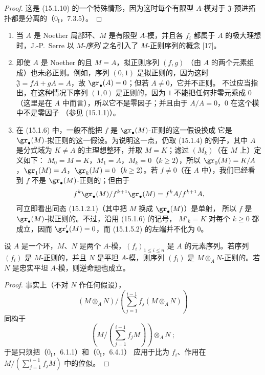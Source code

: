 \begin{proof}
这是 (15.1.10) 的一个特殊情形，因为这时每个有限型 $A$-模对于
$\mathfrak{J}$-预进拓扑都是分离的（$0_{\mathrm I}$，7.3.5）。
\end{proof}

\begin{remarks}[15.1.12]
\label{0.15.1.12-fr}
\mbox{}
\begin{enumerate}
  \item[(i)] 当 $A$ 是 Noether 局部环、$M$ 是有限型 $A$-模，并且各
  $f_i$ 都属于 $A$ 的极大理想时，J.-P.~Serre 以 $M$-\emph{序列}
  之名引入了 $M$-正则序列的概念 [17]。
  \item[(ii)] 即使 $A$ 是 Noether 的且 $M=A$，拟正则序列 $(f,g)$
  （由 $A$ 的两个元素组成）也未必正则。例如，序列 $(0,1)$ 是拟正则的，因为这时
  $\mathfrak{J}=fA+gA=A$，故 $\gr_\bullet(A)=0$；但若 $A\neq0$，它并不正则。
  不过应当指出，在这种情况下序列 $(1,0)$ 是正则的，因为 $1$ 不能把任何非零元乘成
  $0$（这里是在 $A$ 中而言），所以它不是零因子；并且由于 $A/A=0$，$0$ 在这个模中不是零因子
  （参见 (15.1.1)）。
  \item[(iii)]
  在 (15.1.6) 中，一般不能把 $f$ 是 $\gr_\bullet(M)$-正则的这一假设换成
  它是 $\gr_\bullet(M)$-拟正则的这一假设。为说明这一点，仍取 (15.1.4)
  的例子，其中 $A$ 是分式域为 $K\neq A$ 的主理想整环，并取 $M=K$；滤过
  $(M_k)$（在 $M$ 上）定义如下：
  $M_0=M=K$，$M_1=A$，$M_k=0$（$k\geq2$），所以
  $\gr_0(M)=K/A$，$\gr_1(M)=A$，$\gr_k(M)=0$（$k\geq2$）。若
  $f\neq0$（在 $A$ 中），我们已经看到 $f$ 不是
  $\gr_\bullet(M)$-正则的；但由于
  \[
    f^k\gr_\bullet(M)/f^{k+1}\gr_\bullet(M)=f^kA/f^{k+1}A,
  \]
  可立即看出同态 (15.1.2.1)（其中把 $M$ 换成 $\gr_\bullet(M)$）是单射，
  所以 $f$ 是 $\gr_\bullet(M)$-拟正则的。不过，沿用 (15.1.6) 的记号，
  $M'_k=K$ 对每个 $k\geq0$ 都成立，因而 $\gr'_\bullet(M)=0$，而
  (15.1.5.2) 的左端并不化为 $0$。
\end{enumerate}
\end{remarks}



\begin{proposition}[15.1.13]
\label{0.15.1.13-fr}
设 $A$ 是一个环，$M$、$N$ 是两个 $A$-模，$(f_i)_{1\leq i\leq n}$
是 $A$ 的元素序列。若序列 $(f_i)$ 是 $M$-正则的，并且 $N$ 是平坦
$A$-模，则序列 $(f_i)$ 是 $M\otimes_A N$-正则的。若 $N$ 是忠实平坦
$A$-模，则逆命题也成立。
\end{proposition}

\begin{proof}
事实上（不对 $N$ 作任何假设），
\[
  (M\otimes_A N)/
  \left(\sum_{j=1}^{i-1}f_j(M\otimes_A N)\right)
\]
同构于
\[
  \left(M/\left(\sum_{j=1}^{i-1}f_jM\right)\right)\otimes_A N~;
\]
于是只须把（$0_{\mathrm I}$，6.1.1）和（$0_{\mathrm I}$，6.4.1）
应用于比为 $f_i$、作用在 $M/(\sum_{j=1}^{i-1}f_jM)$ 中的位似。
\end{proof}

